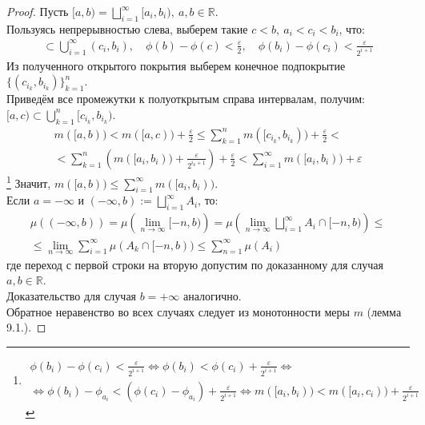 \documentclass[11pt,a4paper]{report}
\def\eps{\varepsilon}
\def\Real{\mathbb{R}}
\theoremstyle{definition}
\theoremstyle{definition}
\theoremstyle{definition}
\begin{document}
	\begin{proof}
		Пусть $ [a, b) = \bigsqcup\limits_{i=1}^{\infty}{[a_{i}, b_{i})},\ a, b \in \Real $.\\
		Пользуясь непрерывностью слева, выберем такие $ c < b,\ a_{i} < c_{i} < b_{i} $, что: 
		\begin{gather*} 
			[a, c] \subset \bigcup\limits_{i=1}^{\infty}{(c_{i}, b_{i})},\quad \phi(b)-\phi(c) < \frac{\eps}{2},\quad \phi(b_{i}) - \phi(c_{i}) < \frac{\eps}{2^{i+1}}
		\end{gather*}
		Из полученного открытого покрытия выберем конечное подпокрытие $ \{ (c_{i_{k}}, b_{i_{k}})\}_{k=1}^{n} $.\\
		Приведём все промежутки к полуоткрытым справа интервалам, получим: $ [a, c) \subset \bigcup_{k=1}^{n}{ [c_{i_{k}}, b_{i_{k}} )} $.\\
		\begin{gather*}
		 m([a, b)) < m([a, c)) + \frac{\eps}{2} \le \sum\limits_{k=1}^{n}{m([c_{i_{k}}, b_{i_{k}})}) + \frac{\eps}{2} <\\< \sum_{k=1}^{n}{\left (m([a_{i}, b_{i})) + \frac{\eps}{2^{i_{k}+1}}\right )} + \frac{\eps}{2} 
		 < \sum_{i=1}^{\infty}{m([a_{i}, b_{i}))} + \eps
		\end{gather*}\footnote{
			\begin{gather*} 
				\phi(b_{i}) - \phi(c_{i}) < \frac{\eps}{2^{i+1}} \Leftrightarrow \phi(b_{i}) < \phi(c_{i}) + \frac{\eps}{2^{i+1}}\Leftrightarrow\\\Leftrightarrow \phi(b_{i}) - \phi_{a_{i}} < (\phi(c_{i}) - \phi_{a_{i}}) + \frac{\eps}{2^{i+1}} \Leftrightarrow m([a_{i}, b_{i})) < m([a_{i}, c_{i})) + \frac{\eps}{2^{i+1}} 
			\end{gather*}
		}
		Значит, $ m([a, b)) \le \sum_{i=1}^{\infty}{m([a_{i}, b_{i}))} $.\\
		Если $ a = -\infty $ и $ (-\infty, b) := \bigsqcup\limits_{i=1}^{\infty}{A_{i}} $, то:
		\begin{gather*} 
			\mu((-\infty, b)) = \mu\left (\lim\limits_{n\to\infty}{[-n, b)}\right ) = \mu\left (\lim\limits_{n\to\infty}{\bigsqcup\limits_{i=1}^{\infty} A_{i} \cap [-n, b)}\right ) \le\\
			\le  \lim\limits_{n\to\infty}{\sum\limits_{i=1}^{\infty}\mu(A_{k} \cap [-n, b))} \le \sum\limits_{n=1}^{\infty}\mu(A_{i})
		\end{gather*}
		где переход с первой строки на вторую допустим по доказанному для случая $ a, b \in \Real $.\\
		Доказательство для случая $ b = +\infty $ аналогично.\\
		Обратное неравенство во всех случаях следует из монотонности меры $ m $ (лемма 9.1.).
	\end{proof}
\end{document}
